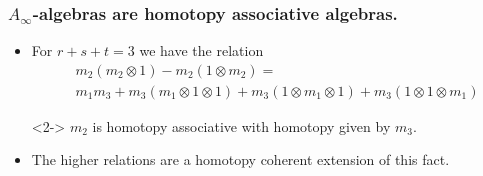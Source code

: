 \documentclass{beamer}
\theoremstyle{definition}
\begin{document}
\begin{frame}
\frametitle{$A_\infty$-algebras are homotopy associative algebras.}
\begin{itemize}
\item<1-> For $r+s+t=3$ we have the relation
\begin{align*}
&m_2(m_2\otimes 1)-m_2(1\otimes m_2)=\\ %
&m_1m_3+m_3(m_1\otimes 1\otimes 1)+m_3(1\otimes m_1\otimes 1)+m_3(1\otimes 1\otimes m_1)
\end{align*}
\item[]<2-> $m_2$ is homotopy associative with homotopy given by $m_3$. %
\item<3-> The higher relations are a homotopy coherent extension of this fact. %
\end{itemize}
\end{frame}
\end{document}
